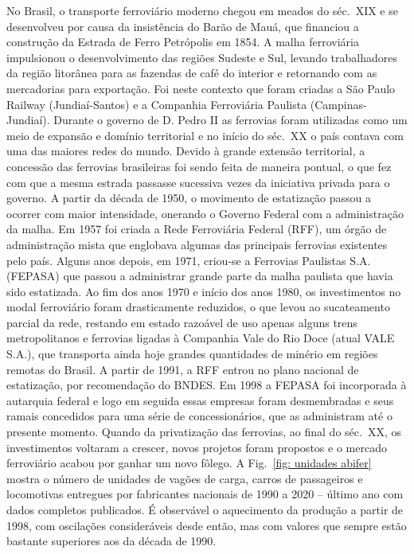 No Brasil, o transporte ferroviário moderno chegou em meados do séc.~XIX e se desenvolveu por causa da insistência do Barão de Mauá, 
que financiou a construção da Estrada de Ferro Petrópolis em 1854. A malha ferroviária impulsionou o desenvolvimento das regiões Sudeste e Sul, 
levando trabalhadores da região litorânea para as fazendas de café do interior e retornando com as mercadorias para exportação. 
Foi neste contexto que foram criadas a São Paulo Railway (Jundiaí-Santos) e a Companhia Ferroviária Paulista (Campinas-Jundiaí). 
Durante o governo de D. Pedro II as ferrovias foram utilizadas como um meio de expansão e domínio territorial e no início do 
séc.~XX o país contava com uma das maiores redes do mundo. Devido à grande extensão territorial, a concessão das ferrovias brasileiras 
foi sendo feita de maneira pontual, o que fez com que a mesma estrada passasse sucessiva vezes da iniciativa privada para o governo.
A partir da década de 1950, o movimento de estatização passou a ocorrer com maior intensidade, 
onerando o Governo Federal com a administração da malha. Em 1957 foi criada a Rede Ferroviária Federal (RFF), um órgão de administração 
mista que englobava algumas das principais ferrovias existentes pelo país. 
Alguns anos depois, em 1971, criou-se a Ferrovias Paulistas S.A. (FEPASA) que passou a administrar grande parte da malha paulista que havia sido estatizada. 
Ao fim dos anos 1970 e início dos anos 1980, os investimentos no modal ferroviário foram drasticamente reduzidos, o que levou ao sucateamento parcial da rede,
restando em estado razoável de uso apenas alguns trens metropolitanos e ferrovias ligadas à Companhia Vale do Rio Doce (atual VALE S.A.), 
que transporta ainda hoje grandes quantidades de minério em regiões remotas do Brasil. A partir de 1991, a RFF entrou no plano nacional de estatização, 
por recomendação do BNDES. Em 1998 a FEPASA foi incorporada à autarquia federal e logo em seguida essas empresas foram desmembradas
e seus ramais concedidos para uma série de concessionários, que as administram até o 
presente momento. Quando da privatização das ferrovias, ao final do séc.~XX, os investimentos voltaram a crescer, 
novos projetos foram propostos e o mercado ferroviário acabou por ganhar um novo fôlego. 
A Fig.~\ref{fig: unidades abifer} mostra o número de unidades de vagões de
carga, carros de passageiros e locomotivas entregues por fabricantes nacionais de 1990 a 2020 --  último ano com dados completos publicados.
É observável o aquecimento da produção a partir de 1998, com oscilações consideráveis desde então, mas com valores que
sempre estão bastante superiores aos da década de 1990.

